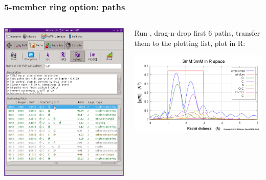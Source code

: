 \documentclass[10pt, xcolor=x11names, compress]{beamer}
\begin{document}
\begin{frame}[fragile]
\begin{columns}
\begin{column}{0.5\linewidth}
    \end{column}  
  \end{columns}
\end{frame}

\begin{frame}
  \frametitle{5-member ring option: paths}
  \begin{columns}
    \begin{column}{0.4\linewidth}
      \includegraphics[width=\linewidth]{images/5member_intrp.png}
    \end{column}
    \begin{column}{0.6\linewidth}
      Run {\feff}, drag-n-drop first 6 paths, transfer them to the
      plotting list, plot in R:

      \medskip

      \includegraphics[width=\linewidth]{images/5member_paths.png}
    \end{column}
  \end{columns}
  

\end{frame}
\end{document}
